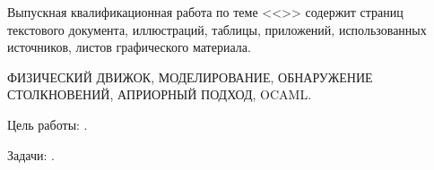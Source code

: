 
Выпускная квалификационная работа по теме <<\Theme>> содержит
\pageref{LastPage} страниц текстового документа,
\TODO иллюстраций,
\TODO таблицы,
\TODO приложений,
\TODO использованных источников,
\TODO листов графического материала.

\MakeUppercase{
    физический движок,
    моделирование,
    обнаружение столкновений,
    априорный подход,
    OCaml.
}

Цель работы: \TODO.

Задачи: \TODO.

\TODO
